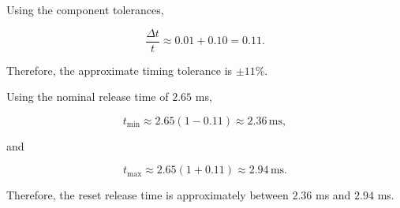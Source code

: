 \documentclass[conference]{IEEEtran}
\begin{document}
Using the component tolerances,

\begin{equation}
\frac{\Delta t}{t}
\approx0.01+0.10=0.11.
\end{equation}

Therefore, the approximate timing tolerance is $\pm11\%$.

Using the nominal release time of $2.65$ ms,

\begin{equation}
t_{\min}\approx2.65(1-0.11)\approx2.36\,\text{ms},
\end{equation}

and

\begin{equation}
t_{\max}\approx2.65(1+0.11)\approx2.94\,\text{ms}.
\end{equation}

Therefore, the reset release time is approximately between
$2.36$ ms and $2.94$ ms.
\end{document}
